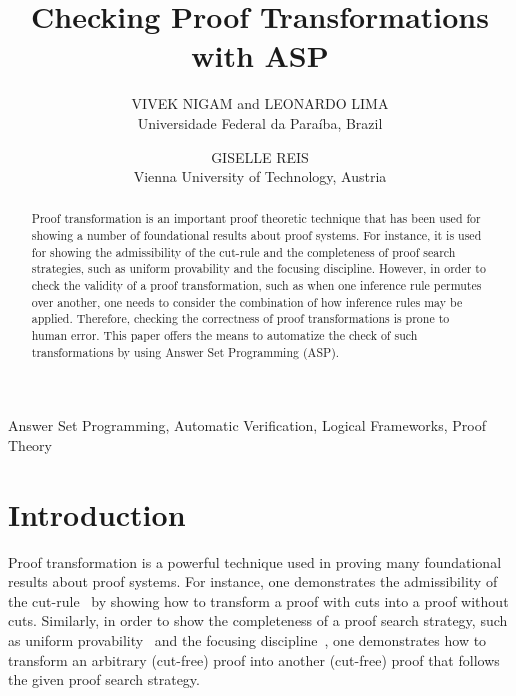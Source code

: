 \documentclass{new_tlp}
\title[International Conference on Logic Programming]
      {Checking Proof Transformations with ASP}
\author[V. Nigam, G. Reis and L. Lima]
       {VIVEK NIGAM and LEONARDO LIMA\\
       Universidade Federal da Para\'{i}ba, Brazil\\
       \email{\{vivek.nigam, leonardo.alfs\}@gmail.com}
       \and GISELLE REIS\\
       Vienna University of Technology, Austria\\
       \email{giselle@logic.at}}
\begin{document}
\label{firstpage}
\maketitle

\begin{abstract}
Proof transformation is an important proof theoretic technique that has
been used for showing a number of foundational results about proof
systems. For instance, it is used for showing the admissibility of the
cut-rule and the completeness of proof search strategies, such as uniform
provability and the focusing discipline. However, in order to check the
validity of a proof transformation, such as when one inference
rule permutes over another, one needs to consider the combination of how 
inference rules may be applied. Therefore, checking the correctness of proof
transformations is prone to human error. This paper offers the means to
automatize the check of such transformations by using Answer Set Programming (ASP). 
\end{abstract}

\begin{keywords}
Answer Set Programming, Automatic Verification, Logical Frameworks, Proof Theory
\end{keywords}

\section{Introduction}
Proof transformation is a powerful technique used in proving many
foundational results about proof systems. For instance, one demonstrates
the admissibility of the cut-rule~\cite{gentzen35} by showing
how to transform a proof with cuts into a proof without cuts.
Similarly, in order to show the completeness of a proof search strategy,
such as uniform provability~\cite{miller91apal}  and the focusing
discipline~\cite{andreoli92jlc}, one demonstrates how to transform an
arbitrary (cut-free) proof into another (cut-free) proof that follows the
given proof search strategy. 
\end{document}

